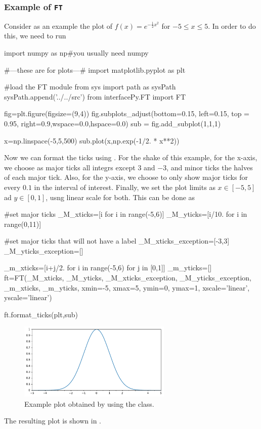 \documentclass[11pt,a4paper]{article}
\begin{document}
\subsubsection*{Example of {\tt FT}}
%
Consider as an example the plot of $f(x) = e^{-\frac{1}{2}x^2}$ for $-5 \leq x \leq 5$. In order to do this, we need to run 
%
\begin{py}
	import numpy as np#you usually need numpy
	
	#---these are for plots---#
	import matplotlib.pyplot as plt
	
	#load the FT module
	from sys import path as sysPath
	sysPath.append('../../src')
	from interfacePy.FT import FT

	fig=plt.figure(figsize=(9,4))
	fig.subplots_adjust(bottom=0.15, left=0.15, top = 0.95, right=0.9,wspace=0.0,hspace=0.0)
	sub = fig.add_subplot(1,1,1)
	
	x=np.linspace(-5,5,500)
	sub.plot(x,np.exp(-1/2. * x**2))
\end{py}

Now we can format the ticks using . For the shake of this example, for the x-axis, we choose as major ticks all integrs except $3$ and $-3$, and minor ticks the halves of each major tick. Also, for the y-axis, we choose to only show major ticks for every $0.1$ in the interval of interest. Finally, we set the plot limits as $x \in [-5,5]$ ad $y \in [0,1]$, usng linear scale for both. This can be done as

\begin{py}
    #set major ticks
	_M_xticks=[i for i in range(-5,6)]
	_M_yticks=[i/10. for i in range(0,11)]
	
	#set major ticks that will not have a label
	_M_xticks_exception=[-3,3]
	_M_yticks_exception=[]
	
	_m_xticks=[i+j/2. for i in range(-5,6) for j in [0,1]]
	_m_yticks=[]  
	ft=FT(_M_xticks, _M_yticks, _M_xticks_exception, _M_yticks_exception, _m_xticks, _m_yticks,
		xmin=-5, xmax=5, ymin=0, ymax=1, xscale='linear', yscale='linear')
	
	ft.format_ticks(plt,sub)    
\end{py}
%
\begin{figure}[t]
	\centering
		\includegraphics[width=0.65\textwidth]{figs/FT_example.pdf}
		\caption{Example plot obtained by using the  class.}
		\label{fig:FT_example}
\end{figure}
%
The resulting plot is shown in .
\end{document}
